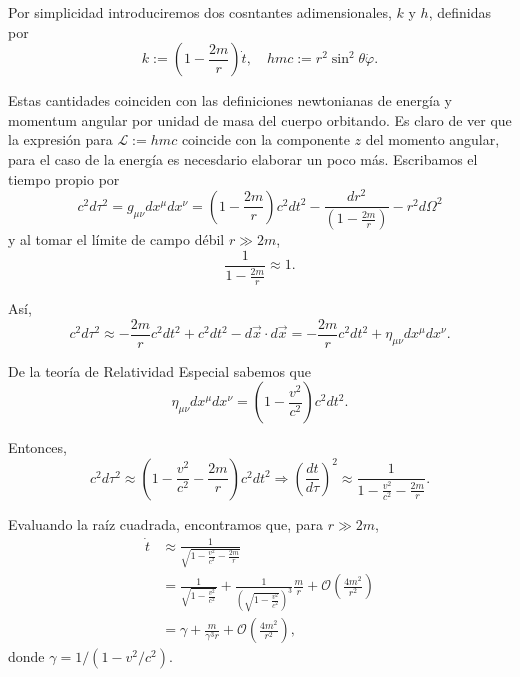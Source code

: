 \documentclass[letterpaper,11pt]{article}
\begin{document}
Por simplicidad introduciremos dos cosntantes adimensionales, $k$ y $h$, definidas por 
\begin{equation} \label{eq:Cantidades-Conservadas}
k:= \left( 1 - \frac{2m}{r}\right) \dot{t}, \quad hmc := r^2 \sin^2\theta \dot{\varphi}.
\end{equation}

Estas cantidades coinciden con las definiciones newtonianas de energía y momentum angular por unidad de masa del cuerpo orbitando. Es claro de ver que la expresión para $\mathcal{L} := hmc$ coincide con la componente $z$ del momento angular, para el caso de la energía es necesdario elaborar un poco más. Escribamos el tiempo propio por
\begin{equation}
c^2d\tau^2 = g_{\mu\nu} dx^{\mu}dx^{\nu} = \left(1 - \frac{2m}{r} \right) c^2 dt^2 - \frac{dr^2}{\left( 1 - \frac{2m}{r}\right)} - r^2 d\Omega^2 
\end{equation}
y al tomar el límite de campo débil $r \gg 2m$, 
\begin{equation}
\frac{1}{1 - \frac{2m}{r}} \approx 1.
\end{equation}

Así,
\begin{equation}
 c^2d\tau^2 \approx - \frac{2m}{r} c^2 dt^2 + c^2 dt^2 - d\vec{x} \cdot d\vec{x} = - \frac{2m}{r} c^2 dt^2 + \eta_{\mu\nu} dx^{\mu}dx^{\nu}.
\end{equation}

De la teoría de Relatividad Especial sabemos que 
\begin{equation}
\eta_{\mu\nu} dx^{\mu}dx^{\nu} = \left( 1 - \frac{v^2}{c^2}\right) c^2 dt^2.
\end{equation}

Entonces, 
\begin{equation}
c^2d\tau^2 \approx \left(1 - \frac{v^2}{c^2} - \frac{2m}{r} \right) c^2 dt^2 \Rightarrow \left(\frac{dt}{d\tau} \right)^2 \approx \frac{1}{1 - \frac{v^2}{c^2} - \frac{2m}{r}}.
\end{equation}

Evaluando la raíz cuadrada, encontramos que, para $r\gg 2m$,
\begin{align}
\dot{t} &\approx \frac{1}{\sqrt{1 - \frac{v^2}{c^2} - \frac{2m}{r}}} \\
&= \frac{1}{\sqrt{1 -\frac{v^2}{c^2}}}  + \frac{1}{\left(\sqrt{1 -\frac{v^2}{c^2}  }\right)^3} \frac{m}{r} + \mathcal{O}\left(\frac{4m^2}{r^2} \right) \\
&= \gamma + \frac{m}{\gamma^3 r} + \mathcal{O}\left(\frac{4m^2}{r^2} \right),
\end{align}
donde $\gamma = 1/(1 - v^2/c^2)$. 
\end{document}
